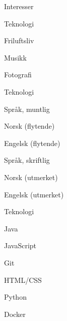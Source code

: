 \begin{cventries}
  \cventry
    {Interesser}
    {}
    {}
    {}
    {
      \begin{cvitems}
        \item {Teknologi}
        \item {Friluftsliv}
        \item {Musikk}
        \item {Fotografi}
        \item {Teknologi}
      \end{cvitems}
    }
    
    \cventry
    {Språk, muntlig}
    {}
    {}
    {}
    {
      \begin{cvitems}
        \item {Norsk (flytende)}
        \item {Engelsk (flytende)}
      \end{cvitems}
    }
    
    \cventry
    {Språk, skriftlig}
    {}
    {}
    {}
    {
      \begin{cvitems}
        \item {Norsk (utmerket)}
        \item {Engelsk (utmerket)}
      \end{cvitems}
    }
    
    \cventry
    {Teknologi}
    {}
    {}
    {}
    {
      \begin{cvitems}
        \item {Java}
        \item {JavaScript}
        \item {Git}
        \item {HTML/CSS}
        \item {Python}
        \item {Docker}
      \end{cvitems}
    }
\end{cventries}

